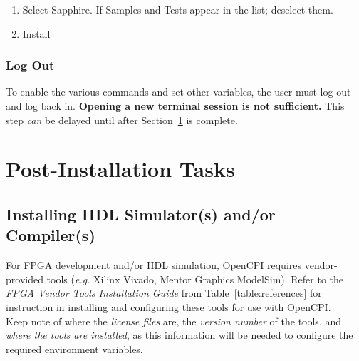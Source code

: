 \begin{enumerate}
\begin{itemize}
\begin{enumerate}
\begin{enumerate}
\item Add the Sapphire 9.1.1 repository
\item Click the ``add'' button (to add a new repository site), fill in the popup form:
\subitem \textit{name:} 
\subitem \textit{location:} 
\item Click ``OK'' to add it
\item Select the down arrow at the end of the ``work with:'' input. Select the new Sapphire repository.
\end{enumerate} %
\item Select Sapphire. If Samples and Tests appear in the list; deselect them.
\item Install

\end{enumerate} %
\end{itemize} %
\end{enumerate} %

\subsubsection{Log Out}
To enable the various  commands and set other variables, the user must log out and log back in. \textbf{Opening a new terminal session is not sufficient.} This step \textit{can} be delayed until after Section~\ref{sec:setup_opencpi} is complete.

\section{Post-Installation Tasks}
\label{sec:setup_opencpi}
\subsection{Installing HDL Simulator(s) and/or Compiler(s)}
\label{subsec:installing_fpga_vendor}
For FPGA development and/or HDL simulation, OpenCPI requires vendor-provided tools (\textit{e.g.} Xilinx Vivado, Mentor Graphics ModelSim). Refer to the \textit{FPGA Vendor Tools Installation Guide} from Table~\ref{table:references} for instruction in installing and configuring these tools for use with OpenCPI.\\

Keep note of where the \textit{license files} are, the \textit{version number} of the tools, and \textit{where the tools are installed}, as this information will be needed to configure the required environment variables.
